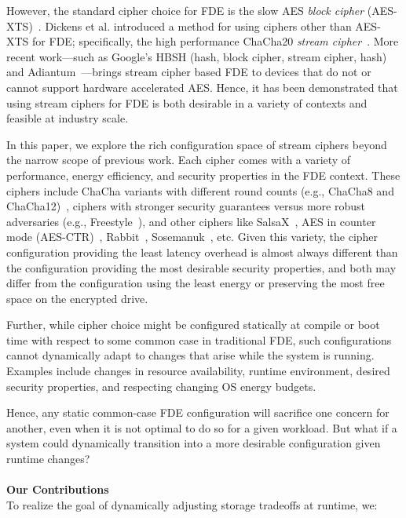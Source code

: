 However, the standard cipher choice for FDE is the slow AES \emph{block cipher}
(AES-XTS)~\cite{XTS, XTSComments, NISTXTS}. Dickens et al. introduced a method
for using ciphers other than AES-XTS for FDE; specifically, the high performance
ChaCha20 \emph{stream cipher}~\cite{StrongBox, ChaCha20}. More recent
work---such as Google's HBSH (hash, block cipher, stream cipher, hash) and
Adiantum~\cite{Adiantum}---brings stream cipher based FDE to devices that do not
or cannot support hardware accelerated AES. Hence, it has been demonstrated that
using stream ciphers for FDE is both desirable in a variety of contexts and
feasible at industry scale.

In this paper, we explore the rich configuration space of stream ciphers beyond
the narrow scope of previous work. Each cipher comes with a variety of
performance, energy efficiency, and security properties in the FDE context.
These ciphers include ChaCha variants with different round counts (e.g.,
ChaCha8 and ChaCha12)~\cite{ChaCha20}, ciphers with stronger security
guarantees versus more robust adversaries (e.g., Freestyle~\cite{Freestyle}),
and other ciphers like SalsaX~\cite{SalsaX}, AES in counter mode
(AES-CTR)~\cite{AESCTR}, Rabbit~\cite{Rabbit}, Sosemanuk~\cite{Sosemanuk}, etc.
Given this variety, the cipher configuration providing the least latency
overhead is almost always different than the configuration providing the most
desirable security properties, and both may differ from the configuration using
the least energy or preserving the most free space on the encrypted drive.

Further, while cipher choice might be configured statically at compile or boot
time with respect to some common case in traditional FDE, such configurations
cannot dynamically adapt to changes that arise while the system is running.
Examples include changes in resource availability, runtime environment, desired
security properties, and respecting changing OS energy budgets.

Hence, any static common-case FDE configuration will sacrifice one concern for
another, even when it is not optimal to do so for a given workload. But what if
a system could dynamically transition into a more desirable configuration given
runtime changes?\\
\\
\textbf{Our Contributions}\\
To realize the goal of dynamically adjusting storage tradeoffs at runtime, we:

